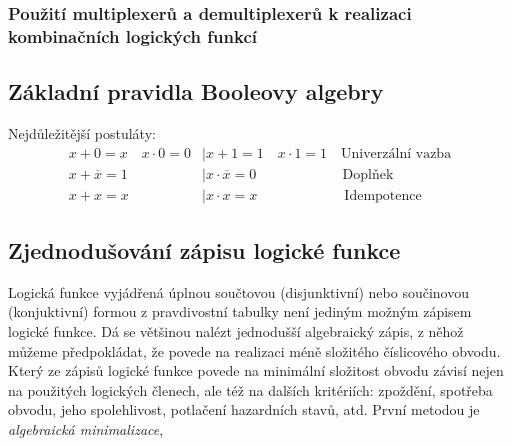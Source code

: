       \subsubsection{Použití multiplexerů a demultiplexerů k realizaci kombinačních logických funkcí}
   
  \subsection{Základní pravidla Booleovy algebry}\label{CES:basic_bool_alg}
    Nejdůležitější postuláty:
    \begin{align}
       x + 0 = x \quad x\cdot 0 = 0 &|  x + 1 = 1 \quad x\cdot 1 = 1               \quad \text{Univerzální vazba}  \\     
       x + \overline{x} = 1         &|  x\cdot\overline{x} = 0  \,\quad\qquad\qquad\quad \text{Doplňek}            \\
       x +x = x                     &|  x\cdot x = x            \ \qquad\qquad\quad\quad \text{Idempotence}  \label{CES:postul_Idemp}
    \end{align}
  \subsection{Zjednodušování zápisu logické funkce}
     Logická funkce vyjádřená úplnou součtovou (disjunktivní) nebo součinovou (konjuktivní) formou z pravdivostní tabulky není
     jediným možným zápisem logické funkce. Dá se většinou nalézt jednodušší algebraický zápis, z něhož můžeme předpokládat, že
     povede na realizaci méně složitého číslicového obvodu. Který ze zápisů logické funkce povede na minimální složitost obvodu
     závisí nejen na použitých logických členech, ale též na dalších kritériích: zpoždění, spotřeba obvodu, jeho spolehlivost,
     potlačení hazardních stavů, atd. První metodou je \emph{algebraická minimalizace}, 
     
